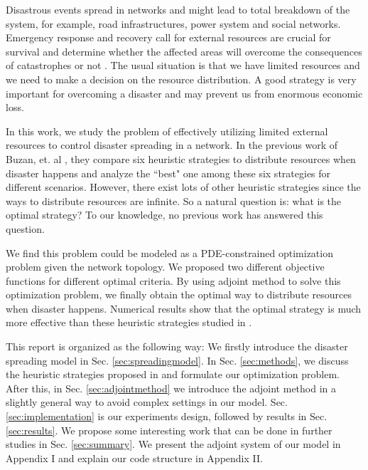 

Disastrous events spread in networks and might lead to total breakdown of the system,  for example, road infrastructures, power system and social networks. Emergency response and recovery call for external resources are crucial for survival and determine whether the affected areas will overcome the consequences of catastrophes or not \cite{buzna2007efficient}. The usual situation is that we have limited resources and we need to make a decision on the resource distribution. A good strategy is very important for overcoming a disaster and may prevent us from enormous economic loss. 

In this work, we study the problem of effectively utilizing limited external resources to control disaster spreading in a network. In the previous work of Buzan, et. al \cite{buzna2007efficient}, they compare six heuristic strategies to distribute resources when disaster happens and analyze the ``best" one among these six strategies for different scenarios. However, there exist lots of other heuristic strategies since the ways to distribute resources are infinite. So a natural question is: what is the optimal strategy? To our knowledge, no previous work has answered this question.

We find this problem could be modeled as a PDE-constrained optimization problem given the network topology. We proposed two different objective functions for different optimal criteria. By using adjoint method to solve this optimization problem, we finally obtain the optimal way to distribute resources when disaster happens. Numerical results show that the optimal strategy is much more effective than these heuristic strategies studied in \cite{buzna2007efficient}.

This report is organized as the following way: We firstly introduce the disaster spreading model in Sec. \ref{sec:spreadingmodel}. In Sec. \ref{sec:methods}, we discuss the heuristic strategies proposed in \cite{buzna2007efficient} and formulate our optimization problem. After this, in Sec. \ref{sec:adjointmethod} we introduce the adjoint method in a slightly general way to avoid complex settings in our model. Sec. \ref{sec:implementation} is our experiments design, followed by results in Sec. \ref{sec:results}. We propose some interesting work that can be done in further studies in Sec. \ref{sec:summary}. We present the adjoint system of our model in Appendix \RN{1} and explain our code structure in Appendix \RN{2}.
